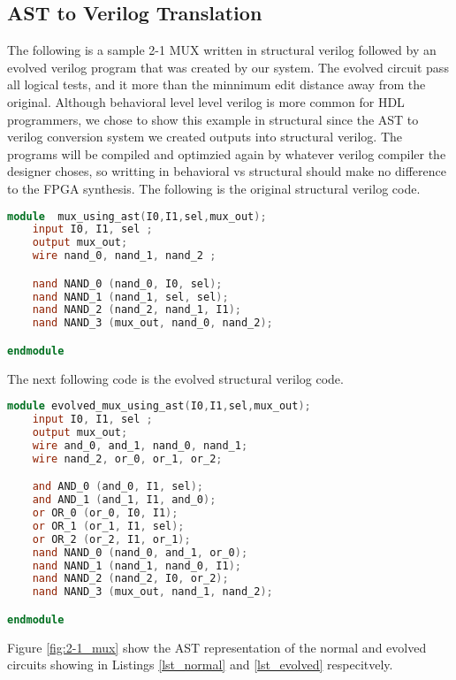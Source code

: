 \documentclass[conference]{IEEEtran}
\begin{document}
{\subsection{AST to Verilog Translation}
\label{ast-to-verilog}
\par The following is a sample 2-1 MUX written in structural verilog followed by an evolved verilog program that was created by our system.
The evolved circuit pass all logical tests, and it more than the minnimum edit distance away from the original.
Although behavioral level level verilog is more common for HDL programmers, we chose to show this example in structural since the AST to verilog conversion system we created outputs into structural verilog.
The programs will be compiled and optimzied again by whatever verilog compiler the designer choses, so writting in behavioral vs structural should make no difference to the FPGA synthesis.
The following is the original structural verilog code.
\begin{lstlisting}[language=Verilog,caption=Normal 2-1 MUX in Structural Verilog,label=lst_normal]
module  mux_using_ast(I0,I1,sel,mux_out);
    input I0, I1, sel ;
    output mux_out;
    wire nand_0, nand_1, nand_2 ;

    nand NAND_0 (nand_0, I0, sel);
    nand NAND_1 (nand_1, sel, sel);
    nand NAND_2 (nand_2, nand_1, I1);
    nand NAND_3 (mux_out, nand_0, nand_2);

endmodule 
\end{lstlisting}
The next following code is the evolved structural verilog code. 
\begin{lstlisting}[language=Verilog,caption=Evolved 2-1 MUX in Structural Verilog,label=lst_evolved]
module evolved_mux_using_ast(I0,I1,sel,mux_out);
    input I0, I1, sel ;
    output mux_out;
    wire and_0, and_1, nand_0, nand_1;
    wire nand_2, or_0, or_1, or_2;

    and AND_0 (and_0, I1, sel);
    and AND_1 (and_1, I1, and_0);
    or OR_0 (or_0, I0, I1);
    or OR_1 (or_1, I1, sel);
    or OR_2 (or_2, I1, or_1);
    nand NAND_0 (nand_0, and_1, or_0);
    nand NAND_1 (nand_1, nand_0, I1);
    nand NAND_2 (nand_2, I0, or_2);
    nand NAND_3 (mux_out, nand_1, nand_2);

endmodule 
\end{lstlisting}

Figure \ref{fig:2-1_mux} show the AST representation of the normal and evolved circuits showing in Listings \ref{lst_normal} and \ref{lst_evolved} respecitvely.

}
\end{document}
